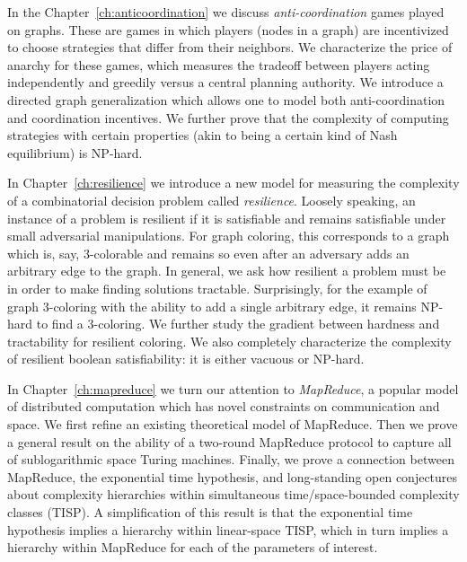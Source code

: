 In the Chapter~\ref{ch:anticoordination} we discuss \emph{anti-coordination}
games played on graphs. These are games in which players (nodes in a graph) are
incentivized to choose strategies that differ from their neighbors. We
characterize the price of anarchy for these games, which measures the tradeoff
between players acting independently and greedily versus a central planning
authority. We introduce a directed graph generalization which allows one to
model both anti-coordination and coordination incentives. We further prove that
the complexity of computing strategies with certain properties (akin to being a
certain kind of Nash equilibrium) is NP-hard.

In Chapter~\ref{ch:resilience} we introduce a new model for measuring the
complexity of a combinatorial decision problem called \emph{resilience}.
Loosely speaking, an instance of a problem is resilient if it is satisfiable
and remains satisfiable under small adversarial manipulations. For graph
coloring, this corresponds to a graph which is, say, 3-colorable and remains so
even after an adversary adds an arbitrary edge to the graph. In general, we ask
how resilient a problem must be in order to make finding solutions tractable.
Surprisingly, for the example of graph 3-coloring with the ability to add a
single arbitrary edge, it remains NP-hard to find a 3-coloring. We further
study the gradient between hardness and tractability for resilient coloring. We
also completely characterize the complexity of resilient boolean
satisfiability: it is either vacuous or NP-hard.

In Chapter~\ref{ch:mapreduce} we turn our attention to \emph{MapReduce}, a
popular model of distributed computation which has novel constraints on
communication and space. We first refine an existing theoretical model of
MapReduce. Then we prove a general result on the ability of a two-round
MapReduce protocol to capture all of sublogarithmic space Turing machines.
Finally, we prove a connection between MapReduce, the exponential time
hypothesis, and long-standing open conjectures about complexity hierarchies
within simultaneous time/space-bounded complexity classes (TISP). A
simplification of this result is that the exponential time hypothesis implies a
hierarchy within linear-space TISP, which in turn implies a hierarchy within
MapReduce for each of the parameters of interest.

